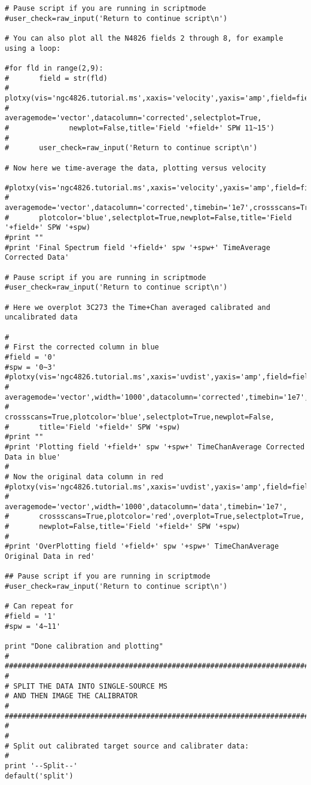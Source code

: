 \begin{verbatim}
# Pause script if you are running in scriptmode
#user_check=raw_input('Return to continue script\n')

# You can also plot all the N4826 fields 2 through 8, for example using a loop:

#for fld in range(2,9):
#       field = str(fld)
#       plotxy(vis='ngc4826.tutorial.ms',xaxis='velocity',yaxis='amp',field=field,spw='11~15',
#              averagemode='vector',datacolumn='corrected',selectplot=True,
#              newplot=False,title='Field '+field+' SPW 11~15')
#       
#       user_check=raw_input('Return to continue script\n')

# Now here we time-average the data, plotting versus velocity

#plotxy(vis='ngc4826.tutorial.ms',xaxis='velocity',yaxis='amp',field=field,spw=spw,
#       averagemode='vector',datacolumn='corrected',timebin='1e7',crossscans=True,
#       plotcolor='blue',selectplot=True,newplot=False,title='Field '+field+' SPW '+spw)
#print ""
#print 'Final Spectrum field '+field+' spw '+spw+' TimeAverage Corrected Data'
        
# Pause script if you are running in scriptmode
#user_check=raw_input('Return to continue script\n')

# Here we overplot 3C273 the Time+Chan averaged calibrated and uncalibrated data

#
# First the corrected column in blue
#field = '0'
#spw = '0~3'
#plotxy(vis='ngc4826.tutorial.ms',xaxis='uvdist',yaxis='amp',field=field,spw=spw,
#       averagemode='vector',width='1000',datacolumn='corrected',timebin='1e7',
#       crossscans=True,plotcolor='blue',selectplot=True,newplot=False,
#       title='Field '+field+' SPW '+spw)
#print ""
#print 'Plotting field '+field+' spw '+spw+' TimeChanAverage Corrected Data in blue'
#
# Now the original data column in red
#plotxy(vis='ngc4826.tutorial.ms',xaxis='uvdist',yaxis='amp',field=field,spw=spw,
#       averagemode='vector',width='1000',datacolumn='data',timebin='1e7',
#       crossscans=True,plotcolor='red',overplot=True,selectplot=True,
#       newplot=False,title='Field '+field+' SPW '+spw)
#
#print 'OverPlotting field '+field+' spw '+spw+' TimeChanAverage Original Data in red'
        
## Pause script if you are running in scriptmode
#user_check=raw_input('Return to continue script\n')

# Can repeat for
#field = '1'
#spw = '4~11'

print "Done calibration and plotting"
#
##########################################################################
#
# SPLIT THE DATA INTO SINGLE-SOURCE MS
# AND THEN IMAGE THE CALIBRATOR
#
##########################################################################
#
#
# Split out calibrated target source and calibrater data:
#
print '--Split--'
default('split')


\end{verbatim}
